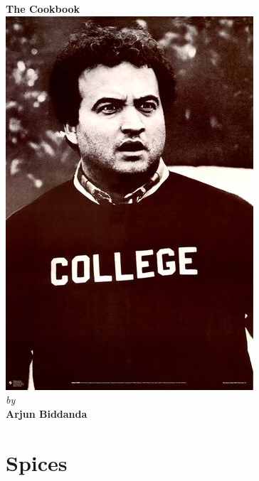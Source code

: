 \documentclass[oneside]{recipe}
\begin{document}
\begin{titlepage}
\begin{center}
	\textbf{\Huge The Cookbook }\\
	\vspace*{\fill}
	\includegraphics[scale=2]{img/college}\\
	\vspace*{\fill}
	\textit{\large by}\\
	\vspace*{4pt}
	\textbf{\large Arjun Biddanda}
	\vspace*{\fill}
	\end{center}
\end{titlepage}

\tableofcontents
% 

%

\chapter{Spices}

\end{document}
